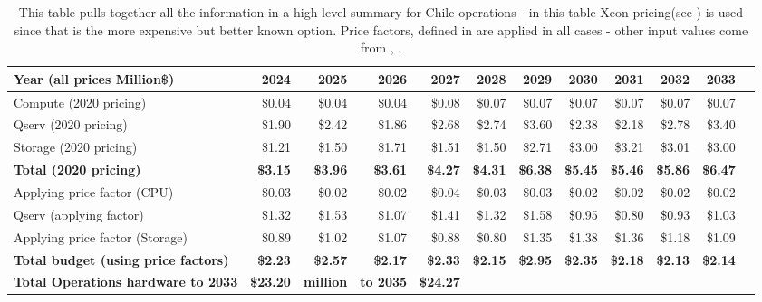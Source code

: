 \tiny \begin{longtable} { |p{}  |r  |r  |r  |r  |r  |r  |r  |r  |r  |r  |r |} 
\caption{This table pulls together all the information in a high level summary for Chile operations - in this table Xeon pricing(see ) is used since that is the more expensive but better known option. Price factors, defined in  are applied in all cases - other input values come from , .
 \label{tab:opsSumChile}}\\ 
\hline 
\textbf{Year  (all prices Million\$)}&\textbf{2024}&\textbf{2025}&\textbf{2026}&\textbf{2027}&\textbf{2028}&\textbf{2029}&\textbf{2030}&\textbf{2031}&\textbf{2032}&\textbf{2033} \\ \hline
{Compute (2020 pricing)}&{\$0.04}&{\$0.04}&{\$0.04}&{\$0.08}&{\$0.07}&{\$0.07}&{\$0.07}&{\$0.07}&{\$0.07}&{\$0.07} \\ \hline
{Qserv (2020 pricing)}&{\$1.90}&{\$2.42}&{\$1.86}&{\$2.68}&{\$2.74}&{\$3.60}&{\$2.38}&{\$2.18}&{\$2.78}&{\$3.40} \\ \hline
{Storage (2020 pricing)}&{\$1.21}&{\$1.50}&{\$1.71}&{\$1.51}&{\$1.50}&{\$2.71}&{\$3.00}&{\$3.21}&{\$3.01}&{\$3.00} \\ \hline
\textbf{Total (2020 pricing)}&\textbf{\$3.15}&\textbf{\$3.96}&\textbf{\$3.61}&\textbf{\$4.27}&\textbf{\$4.31}&\textbf{\$6.38}&\textbf{\$5.45}&\textbf{\$5.46}&\textbf{\$5.86}&\textbf{\$6.47} \\ \hline
{Applying price factor (CPU)}&{\$0.03}&{\$0.02}&{\$0.02}&{\$0.04}&{\$0.03}&{\$0.03}&{\$0.02}&{\$0.02}&{\$0.02}&{\$0.02} \\ \hline
{Qserv (applying factor)}&{\$1.32}&{\$1.53}&{\$1.07}&{\$1.41}&{\$1.32}&{\$1.58}&{\$0.95}&{\$0.80}&{\$0.93}&{\$1.03} \\ \hline
{Applying price factor (Storage)}&{\$0.89}&{\$1.02}&{\$1.07}&{\$0.88}&{\$0.80}&{\$1.35}&{\$1.38}&{\$1.36}&{\$1.18}&{\$1.09} \\ \hline
\textbf{Total budget (using price factors)}&\textbf{\$2.23}&\textbf{\$2.57}&\textbf{\$2.17}&\textbf{\$2.33}&\textbf{\$2.15}&\textbf{\$2.95}&\textbf{\$2.35}&\textbf{\$2.18}&\textbf{\$2.13}&\textbf{\$2.14} \\ \hline
\textbf{Total Operations hardware to 2033}&\textbf{\$23.20}&\textbf{million}&\textbf{to 2035}&\textbf{\$24.27}&&&&&& \\ \hline
\end{longtable} \normalsize

